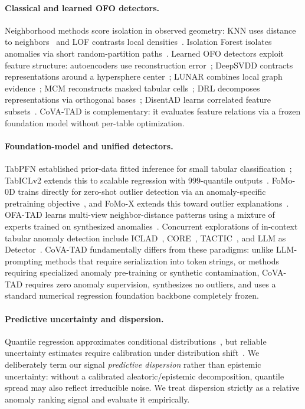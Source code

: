 \documentclass{article}
\begin{document}
\paragraph{Classical and learned OFO detectors.}
Neighborhood methods score isolation in observed geometry: KNN uses distance to neighbors~\citep{ramaswamy2000knn} and LOF contrasts local densities~\citep{breunig2000lof}. Isolation Forest isolates anomalies via short random-partition paths~\citep{liu2008isolation}. Learned OFO detectors exploit feature structure: autoencoders use reconstruction error~\citep{sakurada2014autoencoder}; DeepSVDD contracts representations around a hypersphere center~\citep{ruff2018deep}; LUNAR combines local graph evidence~\citep{goodge2022lunar}; MCM reconstructs masked tabular cells~\citep{yin2024mcm}; DRL decomposes representations via orthogonal bases~\citep{ye2025drl}; DisentAD learns correlated feature subsets~\citep{ye2025disentad}. CoVA-TAD is complementary: it evaluates feature relations via a frozen foundation model without per-table optimization.

\paragraph{Foundation-model and unified detectors.}
TabPFN established prior-data fitted inference for small tabular classification~\citep{hollmann2023tabpfn}; TabICLv2 extends this to scalable regression with 999-quantile outputs~\citep{qu2026tabiclv2}. FoMo-0D trains directly for zero-shot outlier detection via an anomaly-specific pretraining objective~\citep{shen2025fomo}, and FoMo-X extends this toward outlier explanations~\citep{fomox2026}. OFA-TAD learns multi-view neighbor-distance patterns using a mixture of experts trained on synthesized anomalies~\citep{li2026towards}. Concurrent explorations of in-context tabular anomaly detection include ICLAD~\citep{wei2026iclad}, CORE~\citep{zhao2026core}, TACTIC~\citep{tactic2026}, and LLM as Detector~\citep{llmasdetector2026}. CoVA-TAD fundamentally differs from these paradigms: unlike LLM-prompting methods that require serialization into token strings, or methods requiring specialized anomaly pre-training or synthetic contamination, CoVA-TAD requires zero anomaly supervision, synthesizes no outliers, and uses a standard numerical regression foundation backbone completely frozen.

\paragraph{Predictive uncertainty and dispersion.}
Quantile regression approximates conditional distributions~\citep{gneiting2007proper}, but reliable uncertainty estimates require calibration under distribution shift~\citep{kuleshov2018calibrated,romano2019conformalized}. We deliberately term our signal \emph{predictive dispersion} rather than epistemic uncertainty: without a calibrated aleatoric/epistemic decomposition, quantile spread may also reflect irreducible noise. We treat dispersion strictly as a relative anomaly ranking signal and evaluate it empirically.
\end{document}
